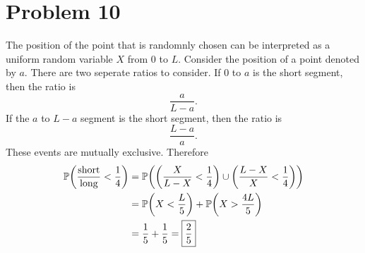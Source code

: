 \documentclass[12pt]{extarticle}
\begin{document}
\section*{Problem 10}
The position of the point that is randomnly chosen can be interpreted as a uniform random variable $X$ from $0$ to $L$. Consider the position of a point denoted by $a$. There are two seperate ratios to consider. If $0$ to $a$ is the short segment, then the ratio is
\[
	\frac{a}{L - a}
.\]
If the $a$ to $L-a$ segment is the short segment, then the ratio is
\[
	\frac{L-a}{a}
.\]
These events are mutually exclusive. Therefore
\begin{align*}
	\mathbb{P}\qty(\frac{\text{short}}{\text{long}} < \frac{1}{4}) &= \mathbb{P}\qty(\qty(\frac{X}{L - X} < \frac{1}{4}) \cup \qty(\frac{L - X}{X} < \frac{1}{4})) \\
														  &= \mathbb{P}\qty(X < \frac{L}{5}) + \mathbb{P}\qty(X > \frac{4L}{5}) \\
														  &= \frac{1}{5} + \frac{1}{5} = \boxed{\frac{2}{5}}
\end{align*}
\end{document}
